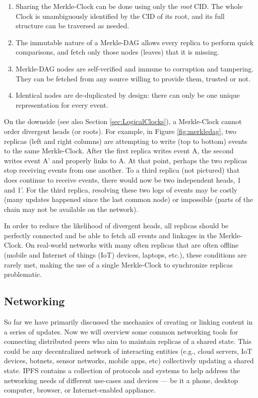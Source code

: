 \documentclass{textile}
\begin{document}
\begin{enumerate}
  \item Sharing the Merkle-Clock can be done using only the \emph{root} CID. The whole Clock is unambiguously identified by the CID of its root, and its full structure can be traversed as needed.
  \item The immutable nature of a Merkle-DAG allows every replica to perform quick comparisons, and fetch only those nodes (leaves) that it is missing.
  \item Merkle-DAG nodes are self-verified and immune to corruption and tampering. They can be fetched from any source willing to provide them, trusted or not.
  \item Identical nodes are de-duplicated by design: there can only be one unique representation for every event.
\end{enumerate}

On the downside (see also Section \ref{sec:LogicalClocks}), a Merkle-Clock cannot order divergent heads (or roots). For example, in Figure \ref{fig:merkledag}, two replicas (left and right columns) are attempting to write (top to bottom) events to the same Merkle-Clock. After the first replica writes event A, the second writes event A' and properly links to A. At that point, perhaps the two replicas stop receiving events from one another. To a third replica (not pictured) that does continue to receive events, there would now be two independent heads, 1 and 1'. For the third replica, resolving these two logs of events may be costly (many updates happened since the last common node) or impossible (parts of the chain may not be available on the network).

In order to reduce the likelihood of divergent heads, all replicas should be perfectly connected and be able to fetch all events and linkages in the Merkle-Clock. On real-world networks with many often replicas that are often offline (mobile and Internet of things (IoT) devices, laptops, etc.), these conditions are rarely met, making the use of a single Merkle-Clock to synchronize replicas problematic.

\FloatBarrier

\subsection{Networking}

So far we have primarily discussed the mechanics of creating or linking content in a series of updates. Now we will overview some common networking tools for connecting distributed peers who aim to maintain replicas of a shared state. This could be any decentralized network of interacting entities (e.g., cloud servers, IoT devices, botnets, sensor networks, mobile apps, etc) collectively updating a shared state. IPFS contains a collection of protocols and systems to help address the networking needs of different use-cases and devices --- be it a phone, desktop computer, browser, or Internet-enabled appliance.
\end{document}
